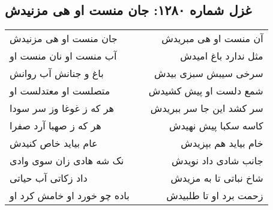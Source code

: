 \begin{center}
\section*{غزل شماره ۱۲۸۰: جان منست او هی مزنیدش}
\label{sec:1280}
\begin{longtable}{l p{0.5cm} r}
جان منست او هی مزنیدش
&&
آن منست او هی مبریدش
\\
آب منست او نان منست او
&&
مثل ندارد باغ امیدش
\\
باغ و جنانش آب روانش
&&
سرخی سیبش سبزی بیدش
\\
متصلست او معتدلست او
&&
شمع دلست او پیش کشیدش
\\
هر که ز غوغا وز سر سودا
&&
سر کشد این جا سر ببریدش
\\
هر که ز صهبا آرد صفرا
&&
کاسه سکبا پیش نهیدش
\\
عام بیاید خاص کنیدش
&&
خام بیاید هم بپزیدش
\\
نک شه هادی زان سوی وادی
&&
جانب شادی داد نویدش
\\
داد زکاتی آب حیاتی
&&
شاخ نباتی تا به مزیدش
\\
باده چو خورد او خامش کرد او
&&
زحمت برد او تا طلبیدش
\\
\end{longtable}
\end{center}
